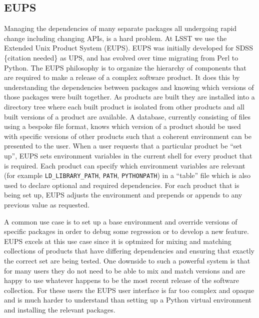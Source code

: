 \subsection{EUPS}\label{sec:eups}

Managing the dependencies of many separate packages all undergoing rapid change including changing APIs, is a hard problem.
At LSST we use the Extended Unix Product System (EUPS)\cite{EUPS}.
EUPS was initially developed for SDSS \{citation needed\} as UPS, and has evolved over time migrating from Perl to Python.
The EUPS philosophy is to organize the hierarchy of components that are required to make a release of a complex software product.
It does this by understanding the dependencies between packages and knowing which versions of those packages were built together.
As products are built they are installed into a directory tree where each built product is isolated from other products and all built versions of a product are available.
A database, currently consisting of files using a bespoke file format, knows which version of a product should be used with specific versions of other products such that a coherent environment can be presented to the user.
When a user requests that a particular product be ``set up'', EUPS sets environment variables in the current shell for every product that is required.
Each product can specify which environment variables are relevant (for example \texttt{LD\_LIBRARY\_PATH}, \texttt{PATH}, \texttt{PYTHONPATH}) in a ``table'' file which is also used to declare optional and required dependencies.
For each product that is being set up, EUPS adjusts the environment and prepends or appends to any previous value as requested.

A common use case is to set up a base environment and override versions of specific packages in order to debug some regression or to develop a new feature.
EUPS excels at this use case since it is optmized for mixing and matching collections of products that have differing dependencies and ensuring that exactly the correct set are being tested.
One downside to such a powerful system is that for many users they do not need to be able to mix and match versions and are happy to use whatever happens to be the most recent release of the software collection.
For these users the EUPS user interface is far too complex and opaque and is much harder to understand than setting up a Python virtual environment and installing the relevant packages.

